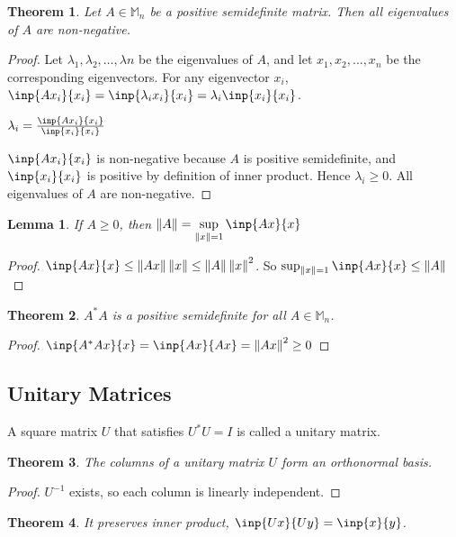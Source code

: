 \documentclass[twofold]{article}
\newcommand*\adj[1]{#1^*}
\newcommand*\norm[1]{\left \Vert #1 \right\Vert}
\theoremstyle{plain}
\newtheorem{theorem}{Theorem}
\newtheorem*{lemma}{Lemma}
\theoremstyle{definition}
\theoremstyle{remark}
\begin{document}
\begin{theorem} Let \(A \in \mathbb{M}_n\) be a positive semidefinite matrix. Then all eigenvalues of \(A\) are non-negative. \end{theorem}
\begin{proof} Let \(\lambda_1, \lambda_2, \ldots , \lambda n\) be the eigenvalues of \(A\), and let \(x_1, x_2, \ldots , x_n\) be the corresponding eigenvectors. For any eigenvector \(x_i\), \(\inp{Ax_i}{x_i} = \inp{\lambda_i x_i}{x_i} = \lambda_i \inp{x_i}{x_i}\). 

\(\lambda_i = \frac{\inp{Ax_i}{x_i}}{\inp{x_i}{x_i}}\)

\(\inp{Ax_i}{x_i} \) is non-negative because \(A\) is positive semidefinite, and \(\inp{x_i}{x_i}\) is positive by definition of inner product. Hence \(\lambda_i \ge 0\). All eigenvalues of \(A\) are non-negative. \end{proof}


\begin{lemma} If \(A \ge 0\), then \(\displaystyle \norm{A} = \sup _{\norm{x} = 1} \inp{Ax}{x}\) \end{lemma}
\begin{proof} \(\inp{Ax}{x} \le \norm{Ax} \norm{x} \le \norm{A} \norm{x}^2\). So \(\sup_{\norm{x} = 1} \inp{Ax}{x} \leq \norm{A} \) \end{proof}

\begin{theorem} \(\adj{A} A\) is a positive semidefinite for all \(A \in \mathbb{M}_n\). \end{theorem}
\begin{proof} \(\inp{\adj{A} A x}{ x} = \inp{Ax}{Ax} = \norm{Ax}^2 \ge 0\)\end{proof}

\subsection{Unitary Matrices}

A square matrix \(U\) that satisfies \(\adj{U} U = I\) is called a unitary matrix.

\begin{theorem} The columns of a unitary matrix \(U\) form an orthonormal basis. \end{theorem}
\begin{proof} \(U^{-1}\) exists, so each column is linearly independent.   \end{proof}


\begin{theorem} It preserves inner product, \(\inp{Ux}{Uy} = \inp{x}{y}\). \end{theorem}
\end{document}

